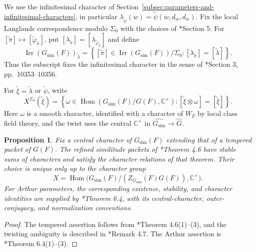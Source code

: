 \documentclass[12pt]{amsart}
\theoremstyle{definition}
\theoremstyle{plain}
\newtheorem{proposition}[definition]{Proposition}
\theoremstyle{remark}
\def\C{\mathbb{C}}%
\DeclareMathOperator{\Hom}{Hom}%
\DeclareMathOperator{\Irr}{Irr}%
\numberwithin{equation}{section}
\begin{document}
We use the infinitesimal character of
Section~\ref{subsec:parameters-and-infinitesimal-characters}, in particular
$\lambda_{\widetilde\psi}(w)=\widetilde\psi(w,d_w,d_w)$.
Fix the local Langlands correspondence modulo $\Sigma_0$ with the
choices of \cite{Xu2024-ArthurPacketsQuasisplitGSp2nGO2n}*{Section 5}.
For $[\widetilde\pi]\mapsto[\widetilde\varphi_{\widetilde\pi}]$,
put $[\lambda_{\widetilde\pi}]
=[\lambda_{\widetilde\varphi_{\widetilde\pi}}]$ and define
\begin{equation}\label{eq:Irr-infinitesimal-character}
 \overline{\Irr}(G_{\mathrm{sim}}(F))_{\widetilde\lambda}
 =\left\{[\widetilde\pi]\in\Irr(G_{\mathrm{sim}}(F))/\Sigma_0:
       [\lambda_{\widetilde\pi}]=[\widetilde\lambda]\right\}.
\end{equation}
Thus the subscript fixes the infinitesimal character in the sense of
\cite{Xu2024-ArthurPacketsQuasisplitGSp2nGO2n}*{Section 3,
pp.~10353--10356}.

For $\widetilde\xi=\widetilde\lambda$ or $\widetilde\psi$, write
\[
 X^{\Sigma_0}(\widetilde\xi)=
 \left\{\omega\in\Hom(G_{\mathrm{sim}}(F)/G(F),\C^\times):
       [\widetilde\xi\otimes\omega]=[\widetilde\xi]\right\}.
\]
Here $\omega$ is a smooth character, identified with a character
of $W_F$ by local class field theory, and the twist uses the central $\C^\times$ in
$\widehat{G_{\mathrm{sim}}}\to\widehat G$.

\begin{proposition}\label{prop:Xu-packets}
Fix a central character of $G_{\mathrm{sim}}(F)$ extending that of a
tempered packet of $G(F)$. The refined
similitude packets of \cite{Xu2018-LPacketsQuasisplitGSp2nGO2n}*{Theorem 4.6}
have stable sums of characters and satisfy the character relations of
that theorem. Their choice is unique only up to the character group
\[
 X=\Hom\bigl(G_{\mathrm{sim}}(F)/(Z_{G_{\mathrm{sim}}}(F)G(F)),\C^\times\bigr).
\]
For Arthur parameters, the corresponding existence, stability, and
character identities are supplied by
\cite{Xu2024-ArthurPacketsQuasisplitGSp2nGO2n}*{Theorem 6.4}, with its
central-character, outer-conjugacy, and normalization conventions.
\end{proposition}
\begin{proof}
The tempered assertion follows from
\cite{Xu2018-LPacketsQuasisplitGSp2nGO2n}*{Theorem 4.6(1)--(3)},
and the twisting ambiguity is described in
\cite{Xu2018-LPacketsQuasisplitGSp2nGO2n}*{Remark 4.7}.
The Arthur assertion is
\cite{Xu2024-ArthurPacketsQuasisplitGSp2nGO2n}*{Theorem 6.4(1)--(3)}.
\end{proof}
\end{document}
